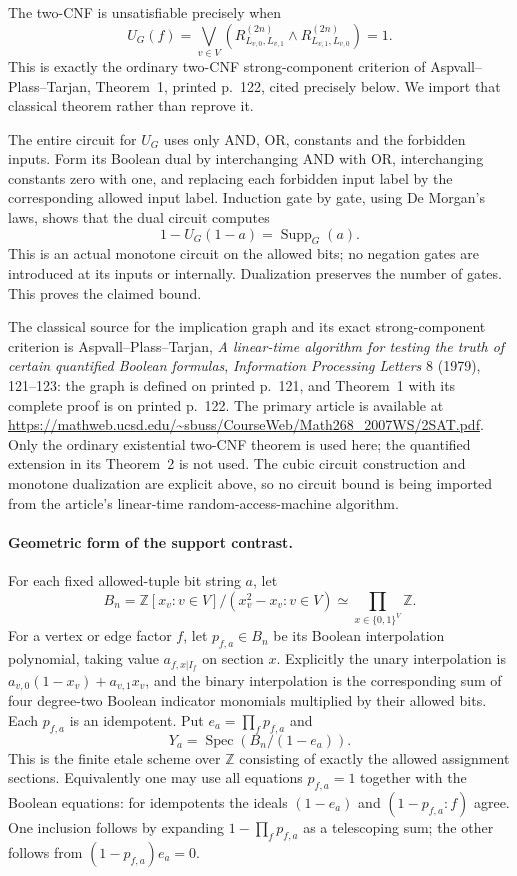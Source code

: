 The two-CNF is unsatisfiable precisely when
\[
 U_G(f)=\bigvee_{v\in V}
 \left(R^{(2n)}_{L_{v,0},L_{v,1}}\wedge
       R^{(2n)}_{L_{v,1},L_{v,0}}\right)=1.
\]
This is exactly the ordinary two-CNF strong-component criterion of
Aspvall--Plass--Tarjan, Theorem~1, printed p.~122, cited precisely
below.  We import that classical theorem rather than reprove it.

The entire circuit for $U_G$ uses only AND, OR, constants and the
forbidden inputs.  Form its Boolean dual by interchanging AND with
OR, interchanging constants zero with one, and replacing each
forbidden input label by the corresponding allowed input label.
Induction gate by gate, using De Morgan's laws, shows that the
dual circuit computes
\[
                            1-U_G(1-a)=\operatorname{Supp}_G(a).
\]
This is an actual monotone circuit on the allowed bits; no negation
gates are introduced at its inputs or internally.  Dualization
preserves the number of gates.  This proves the claimed bound.

The classical source for the implication graph and its exact
strong-component criterion is Aspvall--Plass--Tarjan,
\emph{A linear-time algorithm for testing the truth of certain
quantified Boolean formulas}, \emph{Information Processing Letters}
8 (1979), 121--123: the graph is defined on printed p.~121, and
Theorem~1 with its complete proof is on printed p.~122.
The primary article is available at
\url{https://mathweb.ucsd.edu/~sbuss/CourseWeb/Math268_2007WS/2SAT.pdf}.
Only the ordinary existential two-CNF theorem is used here; the
quantified extension in its Theorem~2 is not used.  The cubic circuit
construction and monotone dualization are explicit above, so no
circuit bound is being imported from the article's
linear-time random-access-machine algorithm.

\paragraph{Geometric form of the support contrast.}
For each fixed allowed-tuple bit string $a$, let
\[
 B_n=\mathbb Z[x_v:v\in V]/(x_v^2-x_v:v\in V)
                   \simeq\prod_{x\in\{0,1\}^V}\mathbb Z.
\]
For a vertex or edge factor $f$, let $p_{f,a}\in B_n$ be its
Boolean interpolation polynomial, taking value $a_{f,x|I_f}$
on section $x$.  Explicitly the unary interpolation is
$a_{v,0}(1-x_v)+a_{v,1}x_v$, and the binary interpolation is
the corresponding sum of four degree-two Boolean indicator
monomials multiplied by their allowed bits.  Each $p_{f,a}$
is an idempotent.  Put $e_a=\prod_f p_{f,a}$ and
\[
                 Y_a=\operatorname{Spec}(B_n/(1-e_a)).
\]
This is the finite etale scheme over $\mathbb Z$ consisting of
exactly the allowed assignment sections.  Equivalently one may
use all equations $p_{f,a}=1$ together with the Boolean equations:
for idempotents the ideals $(1-e_a)$ and $(1-p_{f,a}:f)$ agree.
One inclusion follows by expanding $1-\prod_f p_{f,a}$ as a
telescoping sum; the other follows from
$(1-p_{f,a})e_a=0$.

